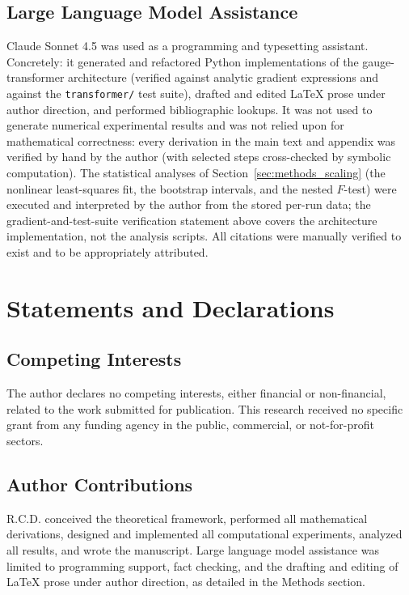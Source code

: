 \documentclass[11pt]{article}
\begin{document}
\subsection{Large Language Model Assistance}
Claude Sonnet 4.5 was used as a programming and typesetting assistant. Concretely: it generated and refactored Python implementations of the gauge-transformer architecture (verified against analytic gradient expressions and against the \texttt{transformer/} test suite), drafted and edited LaTeX prose under author direction, and performed bibliographic lookups. It was not used to generate numerical experimental results and was not relied upon for mathematical correctness: every derivation in the main text and appendix was verified by hand by the author (with selected steps cross-checked by symbolic computation). The statistical analyses of Section~\ref{sec:methods_scaling} (the nonlinear least-squares fit, the bootstrap intervals, and the nested $F$-test) were executed and interpreted by the author from the stored per-run data; the gradient-and-test-suite verification statement above covers the architecture implementation, not the analysis scripts. All citations were manually verified to exist and to be appropriately attributed.

\section*{Statements and Declarations}

\subsection*{Competing Interests}
The author declares no competing interests, either financial or non-financial, related to the work submitted for publication. This research received no specific grant from any funding agency in the public, commercial, or not-for-profit sectors.

\subsection*{Author Contributions}
R.C.D. conceived the theoretical framework, performed all mathematical derivations, designed and implemented all computational experiments, analyzed all results, and wrote the manuscript. Large language model assistance was limited to programming support, fact checking, and the drafting and editing of LaTeX prose under author direction, as detailed in the Methods section.
\end{document}
